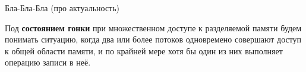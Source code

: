 \Introduction

Бла-Бла-Бла (про актуальность)

Под \textbf{состоянием гонки} при множественном доступе к разделяемой памяти будем понимать ситуацию, когда два или более потоков одновремено совершают доступ к общей области памяти, и по крайней мере хотя бы один из них выполняет операцию записи в неё. 




